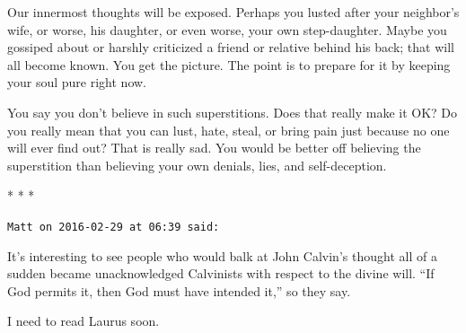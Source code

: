 Our innermost thoughts will be exposed. Perhaps you lusted after your neighbor's wife, or worse, his daughter, or even worse, your own step-daughter. Maybe you gossiped about or harshly criticized a friend or relative behind his back; that will all become known. You get the picture. The point is to prepare for it by keeping your soul pure right now.

You say you don't believe in such superstitions. Does that really make it OK? Do you really mean that you can lust, hate, steal, or bring pain just because no one will ever find out? That is really sad. You would be better off believing the superstition than believing your own denials, lies, and self-deception.



\begin{center}* * *\end{center}

\begin{footnotesize}
\begin{sffamily}
\texttt{Matt on 2016-02-29 at 06:39 said:}

It's interesting to see people who would balk at John Calvin's thought all of a sudden became unacknowledged Calvinists with respect to the divine will. ``If God permits it, then God must have intended it,'' so they say.

I need to read Laurus soon.

\end{sffamily}
\end{footnotesize}

